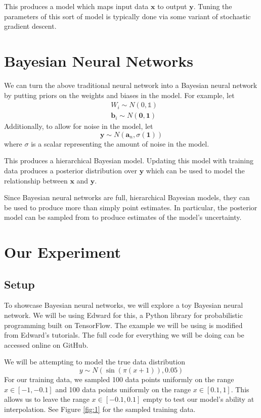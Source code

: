 \documentclass[
    preprint,
    12pt,
    letterpaper,
    longbibliography,
    nofootinbib,
    amsmath,
    amssymb,
    amsfonts,
]{revtex4-1}
\newcommand{\pn}[1]{\left(#1\right)}
\newcommand{\bbm}[1]{\mathbb{#1}}
\begin{document}
This produces a model which maps input data $\bm x$ to output $\bm y$. Tuning the parameters of this sort of model is typically done via some variant of stochastic gradient descent.

\section{Bayesian Neural Networks}

We can turn the above traditional neural network into a Bayesian neural network by putting priors on the weights and biases in the model. For example, let
\begin{align*}
    & W_i \sim N(0, \bbm 1) \\
    & \bm b_i \sim N(\bm 0, \bm 1)
\end{align*}
Additionally, to allow for noise in the model, let
\[
    \bm y \sim N\pn{\bm a_n, \sigma (\bm 1)}
\]
where $\sigma$ is a scalar representing the amount of noise in the model.

This produces a hierarchical Bayesian model. Updating this model with training data produces a posterior distribution over $\bm y$ which can be used to model the relationship between $\bm x$ and $\bm y$.

Since Bayesian neural networks are full, hierarchical Bayesian models, they can be used to produce more than simply point estimates. In particular, the posterior model can be sampled from to produce estimates of the model's uncertainty.

\section{Our Experiment}

\subsection{Setup}

To showcase Bayesian neural networks, we will explore a toy Bayesian neural network. We will be using Edward for this, a Python library for probabilistic programming built on TensorFlow.\cite{edward} The example we will be using is modified from Edward's tutorials.\cite{tutorial} The full code for everything we will be doing can be accessed online on GitHub.\cite{code}

We will be attempting to model the true data distribution
\[
    y \sim N\pn{\sin(\pi(x+1)), 0.05}
\]
For our training data, we sampled 100 data points uniformly on the range $x \in [-1, -0.1]$ and 100 data points uniformly on the range $x \in [0.1, 1]$. This allows us to leave the range $x \in [-0.1, 0.1]$ empty to test our model's ability at interpolation. See Figure \ref{fig:1} for the sampled training data.
\end{document}
